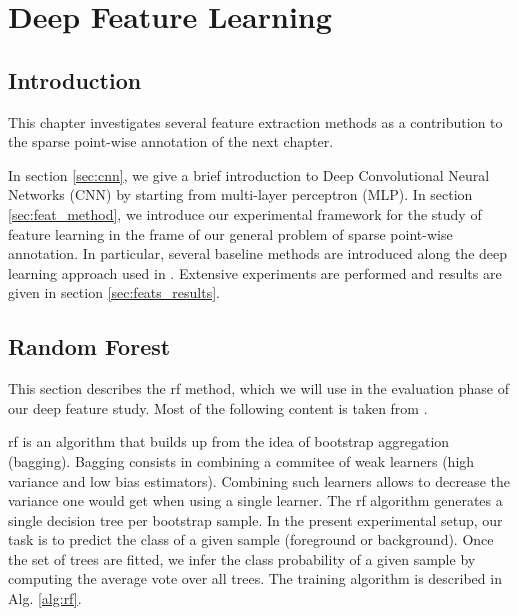 \chapter{Deep Feature Learning}

\renewcommand{\thealgsubstate}{\alph{algsubstate}}
\newenvironment{algsubstates}
  {\setcounter{algsubstate}{0}%
   \renewcommand{\State}{%
     \stepcounter{algsubstate}%
     \Statex {\footnotesize\thealgsubstate:}\space}}
  {}
\section{Introduction}

This chapter investigates several feature extraction methods as a contribution to the sparse point-wise annotation of the next chapter.

In section \ref{sec:cnn}, we give a brief introduction to Deep Convolutional Neural Networks (CNN) by starting from multi-layer perceptron (MLP).
In section \ref{sec:feat_method}, we introduce our experimental framework for the study of feature learning in the frame of our general problem of sparse point-wise annotation.
In particular, several baseline methods are introduced along the deep learning approach used in \cite{lejeune18}.
Extensive experiments are performed and results are given in section \ref{sec:feats_results}.

\section{Random Forest}
\label{sec:rf}
This section describes the \gls{rf} method, which we will use in the evaluation phase of our deep feature study.
Most of the following content is taken from \cite{hastie09}.

\gls{rf} is an algorithm that builds up from the idea of bootstrap aggregation (bagging).
Bagging consists in combining a commitee of weak learners (high variance and low bias estimators).
Combining such learners allows to decrease the variance one would get when using a single learner.
The \gls{rf} algorithm generates a single decision tree per bootstrap sample.
In the present experimental setup, our task is to predict the class of a given sample (foreground or background).
Once the set of trees are fitted, we infer the class probability of a given sample by computing the average vote over all trees.
The training algorithm is described in Alg. \ref{alg:rf}.


